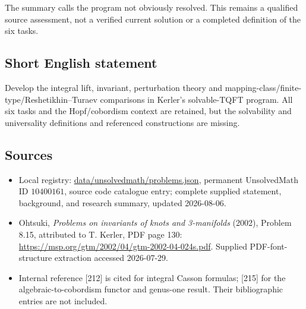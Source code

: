 \documentclass[11pt]{article}
\begin{document}
The summary calls the program not obviously resolved. This remains a qualified source assessment, not a verified current solution or a completed definition of the six tasks.
\subsection{Short English statement}
Develop the integral lift, invariant, perturbation theory and mapping-class/finite-type/Reshetikhin--Turaev comparisons in Kerler's solvable-TQFT program. All six tasks and the Hopf/cobordism context are retained, but the solvability and universality definitions and referenced constructions are missing.
\subsection{Sources}
\begin{itemize}
\item Local registry: \url{data/unsolvedmath/problems.json}, permanent UnsolvedMath ID \(10400161\), source code catalogue entry; complete supplied statement, background, and research summary, updated 2026-08-06.
\item Ohtsuki, \emph{Problems on invariants of knots and 3-manifolds} (2002), Problem 8.15, attributed to T. Kerler, PDF page 130: \url{https://msp.org/gtm/2002/04/gtm-2002-04-024s.pdf}. Supplied PDF-font-structure extraction accessed 2026-07-29.
\item Internal reference [212] is cited for integral Casson formulas; [215] for the algebraic-to-cobordism functor and genus-one result. Their bibliographic entries are not included.
\end{itemize}
\end{document}
